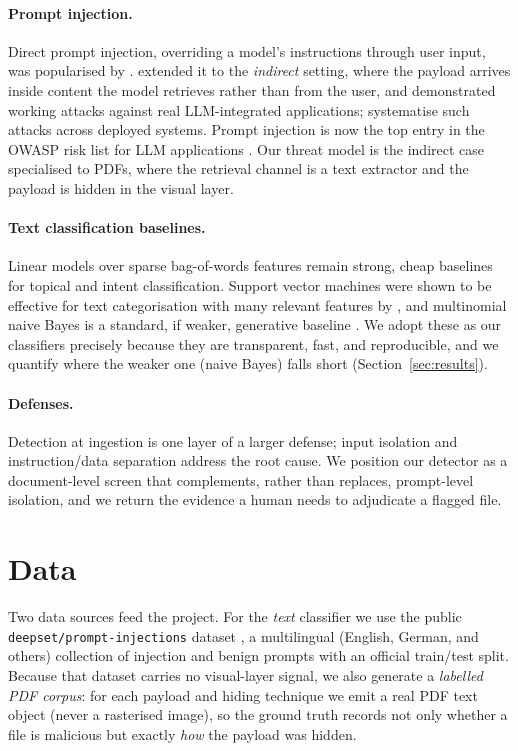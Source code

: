 \documentclass[11pt]{article}
\begin{document}
\paragraph{Prompt injection.} Direct prompt injection, overriding a model's
instructions through user input, was popularised by \citet{perez2022ignore}.
\citet{greshake2023injection} extended it to the \emph{indirect} setting, where
the payload arrives inside content the model retrieves rather than from the
user, and demonstrated working attacks against real LLM-integrated
applications; \citet{liu2023promptinjection} systematise such attacks across
deployed systems. Prompt injection is now the top entry in the OWASP risk list
for LLM applications \citep{owasp2023llm}. Our threat model is the indirect
case specialised to PDFs, where the retrieval channel is a text extractor and
the payload is hidden in the visual layer.

\paragraph{Text classification baselines.} Linear models over sparse
bag-of-words features remain strong, cheap baselines for topical and
intent classification. Support vector machines were shown to be effective for
text categorisation with many relevant features by \citet{joachims1998text},
and multinomial naive Bayes is a standard, if weaker, generative baseline
\citep{mccallum1998comparison}. We adopt these as our classifiers precisely
because they are transparent, fast, and reproducible, and we quantify where the
weaker one (naive Bayes) falls short (Section~\ref{sec:results}).

\paragraph{Defenses.} Detection at ingestion is one layer of a larger defense;
input isolation and instruction/data separation address the root cause. We
position our detector as a document-level screen that complements, rather than
replaces, prompt-level isolation, and we return the evidence a human needs to
adjudicate a flagged file.

\section{Data}
\label{sec:data}

Two data sources feed the project. For the \emph{text} classifier we use the
public \texttt{deepset/prompt-injections} dataset
\citep{deepset2023promptinjections}, a multilingual (English, German, and
others) collection of injection and benign prompts with an official train/test
split. Because that dataset carries no visual-layer signal, we also
generate a \emph{labelled PDF corpus}: for each payload and hiding technique we
emit a real PDF text object (never a rasterised image), so the ground truth
records not only whether a file is malicious but exactly \emph{how} the payload
was hidden.
\end{document}
